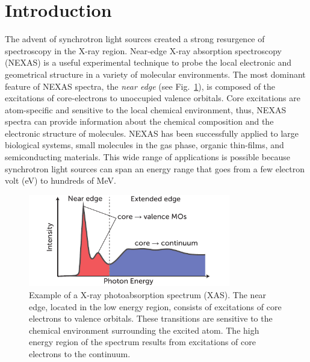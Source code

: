 \documentclass[12pt]{article}
\begin{document}
\section{Introduction}
The advent of synchrotron light sources created a strong resurgence of spectroscopy in the X-ray region. \cite{mcmillan_synchrotronproposed_1945} Near-edge X-ray absorption spectroscopy (NEXAS) is a useful experimental technique to probe the local electronic and geometrical structure in a variety of molecular environments.
The most dominant feature of NEXAS spectra, the \textit{near edge}  (see Fig.~\ref{fig:nexas-illustration}), is composed of the excitations of core-electrons to unoccupied valence orbitals.
Core excitations are atom-specific and sensitive to the local chemical environment, thus, NEXAS spectra can provide information about the chemical composition and the electronic structure of molecules.
NEXAS has been successfully applied to large biological systems, \cite{hua_refinement_2010} small molecules in the gas phase,\cite{contini_gas-phase_2001} organic thin-films,\cite{hahner_near_2006} and semiconducting materials.\cite{guo_electronic_2011} This wide range of applications is possible because synchrotron light sources can span an energy range that goes from a few electron volt (eV) \cite{feneberg_synchrotron-based_2011} to hundreds of MeV.\cite{nakazato_observation_1989}

\begin{figure}[!b]
\centering
\includegraphics[width=8.8cm]{NEXASIllustration.pdf}
\caption{Example of a X-ray photoabsorption spectrum (XAS).  The near edge, located in the low energy region, consists of excitations of core electrons to valence orbitals.  These transitions are sensitive to the chemical environment surrounding the excited atom.  The high energy region of the spectrum results from excitations of core electrons to the continuum.}
\label{fig:nexas-illustration}
\end{figure}
\end{document}

